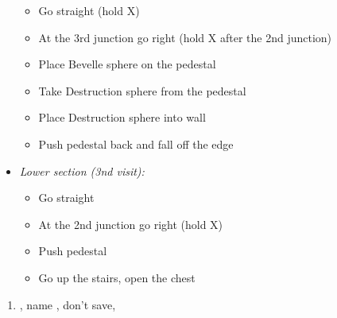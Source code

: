 \begin{trial}
\begin{itemize}
			\begin{itemize}
				\item Go straight (hold X)
				\item At the 3rd junction go right (hold X after the 2nd junction)
				\item Place Bevelle sphere on the pedestal
				\item Take Destruction sphere from the pedestal
				\item Place Destruction sphere into wall
				\item Push pedestal back and fall off the edge
			\end{itemize}
		\item \textit{Lower section (3nd visit):}
			\begin{itemize}
				\item Go straight
				\item At the 2nd junction go right (hold X)
				\item Push pedestal
				\item Go up the stairs, open the chest
			\end{itemize}
	\end{itemize}
\end{trial}
\begin{enumerate}[resume]
	\item \sd, name \bahamut, don't save, \sd
\end{enumerate}
\lossvfill
\ 
\losscb
\ \lossnewline \ 
